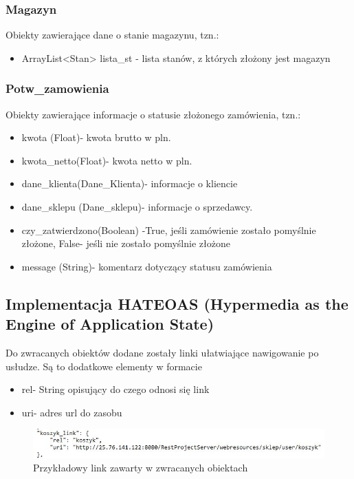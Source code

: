 \documentclass[11pt]{article}   %
\begin{document}
\subsubsection{Magazyn}
Obiekty zawierające dane o stanie magazynu, tzn.:
\begin{itemize}
	\item ArrayList<Stan> lista\_st - lista stanów, z których złożony jest magazyn
\end{itemize}

\subsubsection{Potw\_zamowienia}
Obiekty zawierające informacje o statusie złożonego zamówienia, tzn.:
\begin{itemize}
	\item kwota (Float)- kwota brutto w pln.
	\item kwota\_netto(Float)- kwota netto w pln.
	\item dane\_klienta(Dane\_Klienta)- informacje o kliencie
	\item dane\_sklepu (Dane\_sklepu)- informacje o sprzedawcy.
	\item czy\_zatwierdzono(Boolean) -True, jeśli zamówienie zostało pomyślnie złożone, False- jeśli nie zostało pomyślnie złożone
	\item message (String)- komentarz dotyczący statusu zamówienia
\end{itemize}
\subsection {Implementacja HATEOAS (Hypermedia as the Engine of Application State)
}
Do zwracanych obiektów dodane zostały linki ułatwiające nawigowanie po usłudze. Są to dodatkowe elementy w formacie 
\begin{itemize}
	\item rel- String opisujący do czego odnosi się link
	\item uri- adres url do zasobu
\end{itemize}
\begin{figure}[H]
	\centering
	\includegraphics[width=0.8\linewidth]{komunikaty_zdjecia_rest/link}
	\caption{Przykładowy link zawarty w zwracanych obiektach}
	\label{zrzut0}
\end{figure}
\end{document}
